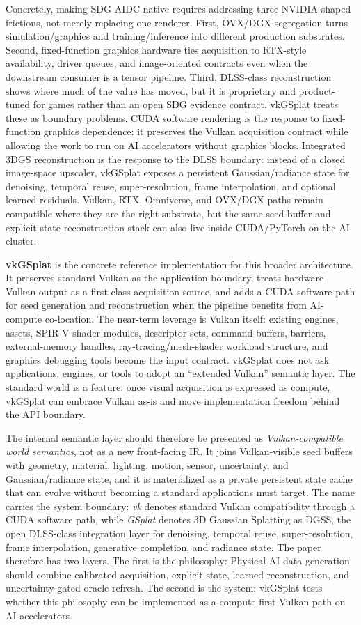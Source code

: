 \documentclass[10pt,journal,onecolumn]{IEEEtran}
\begin{document}
Concretely, making SDG AIDC-native requires addressing three NVIDIA-shaped
frictions, not merely replacing one renderer. First, OVX/DGX segregation turns
simulation/graphics and training/inference into different production substrates.
Second, fixed-function graphics hardware ties acquisition to RTX-style
availability, driver queues, and image-oriented contracts even when the
downstream consumer is a tensor pipeline. Third, DLSS-class reconstruction
shows where much of the value has moved, but it is proprietary and
product-tuned for games rather than an open SDG evidence contract. vkGSplat
treats these as boundary problems. CUDA software rendering is the response to
fixed-function graphics dependence: it preserves the Vulkan acquisition
contract while allowing the work to run on AI accelerators without graphics
blocks. Integrated 3DGS reconstruction is the response to the DLSS boundary:
instead of a closed image-space upscaler, vkGSplat exposes a persistent
Gaussian/radiance state for denoising, temporal reuse, super-resolution, frame
interpolation, and optional learned residuals. Vulkan, RTX, Omniverse, and
OVX/DGX paths remain compatible where they are the right substrate, but the same
seed-buffer and explicit-state reconstruction stack can also live inside
CUDA/PyTorch on the AI cluster.

\textbf{vkGSplat} is the concrete reference implementation for this broader
architecture. It preserves standard Vulkan as the application boundary, treats
hardware Vulkan output as a first-class acquisition source, and adds a CUDA
software path for seed generation and reconstruction when the pipeline benefits
from AI-compute co-location. The near-term leverage is Vulkan itself: existing
engines, assets, SPIR-V shader modules, descriptor sets, command buffers,
barriers, external-memory handles, ray-tracing/mesh-shader workload structure,
and graphics debugging tools become the input contract. vkGSplat does not ask
applications, engines, or tools to adopt an ``extended Vulkan'' semantic layer.
The standard world is a feature: once visual acquisition is expressed as
compute, vkGSplat can embrace Vulkan as-is and move implementation freedom
behind the API boundary.

The internal semantic layer should therefore be presented as
\emph{Vulkan-compatible world semantics}, not as a new front-facing IR. It joins
Vulkan-visible seed buffers with geometry, material, lighting, motion, sensor,
uncertainty, and Gaussian/radiance state, and it is materialized as a private
persistent state cache that can evolve without becoming a standard applications
must target. The name carries the system boundary: \emph{vk} denotes standard
Vulkan compatibility through a CUDA software path, while \emph{GSplat} denotes
3D Gaussian Splatting as DGSS, the open DLSS-class integration layer for denoising,
temporal reuse, super-resolution, frame interpolation, generative completion,
and radiance state. The
paper therefore has two layers. The first is the philosophy:
Physical AI data generation should combine calibrated acquisition, explicit
state, learned reconstruction, and uncertainty-gated oracle refresh. The second
is the system: vkGSplat tests whether this philosophy can be implemented as a
compute-first Vulkan path on AI accelerators.
\end{document}
